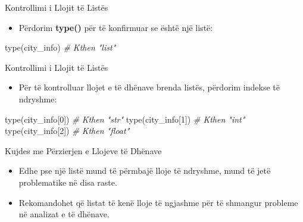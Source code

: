 \documentclass[
  ignorenonframetext,
]{beamer}
\newenvironment{Shaded}{\begin{snugshade}}{\end{snugshade}}
\newcommand{\BuiltInTok}[1]{#1}
\newcommand{\CommentTok}[1]{\textcolor[rgb]{0.56,0.35,0.01}{\textit{#1}}}
\newcommand{\DecValTok}[1]{\textcolor[rgb]{0.00,0.00,0.81}{#1}}
\newcommand{\NormalTok}[1]{#1}
\providecommand{\tightlist}{%
  \setlength{\itemsep}{0pt}\setlength{\parskip}{0pt}}
\begin{document}
\begin{frame}[fragile]{Kontrollimi i Llojit të Listës}
\protect\hypertarget{kontrollimi-i-llojit-tuxeb-listuxebs}{}
\begin{itemize}
\tightlist
\item
  Përdorim \textbf{type()} për të konfirmuar se është një listë:
\end{itemize}

\begin{Shaded}
\begin{Highlighting}[]
\BuiltInTok{type}\NormalTok{(city\_info)  }\CommentTok{\# Kthen "list"}
\end{Highlighting}
\end{Shaded}
\end{frame}

\begin{frame}[fragile]{Kontrollimi i Llojit të Listës}
\protect\hypertarget{kontrollimi-i-llojit-tuxeb-listuxebs-1}{}
\begin{itemize}
\tightlist
\item
  Për të kontrolluar llojet e të dhënave brenda listës, përdorim indekse
  të ndryshme:
\end{itemize}

\begin{Shaded}
\begin{Highlighting}[]
\BuiltInTok{type}\NormalTok{(city\_info[}\DecValTok{0}\NormalTok{])  }\CommentTok{\# Kthen "str"}
\BuiltInTok{type}\NormalTok{(city\_info[}\DecValTok{1}\NormalTok{])  }\CommentTok{\# Kthen "int"}
\BuiltInTok{type}\NormalTok{(city\_info[}\DecValTok{2}\NormalTok{])  }\CommentTok{\# Kthen "float"}
\end{Highlighting}
\end{Shaded}
\end{frame}

\begin{frame}{Kujdes me Përzierjen e Llojeve të Dhënave}
\protect\hypertarget{kujdes-me-puxebrzierjen-e-llojeve-tuxeb-dhuxebnave}{}
\begin{itemize}
\item
  Edhe pse një listë mund të përmbajë lloje të ndryshme, mund të jetë
  problematike në disa raste.
\item
  Rekomandohet që listat të kenë lloje të ngjashme për të shmangur
  probleme në analizat e të dhënave.
\end{itemize}
\end{frame}
\end{document}
